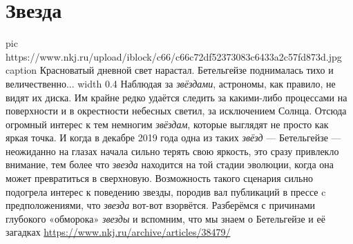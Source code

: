  
 
 
 
 
\chapter{Звезда}

\ifcmt
  pic https://www.nkj.ru/upload/iblock/c66/c66c72df52373083c6433a2c57fd873d.jpg
	caption Красноватый дневной свет нарастал. Бетельгейзе поднималась тихо и величественно... 
	width 0.4
\fi
Наблюдая за \emph{звёздами}, астрономы, как правило, не видят их диска. Им
крайне редко удаётся следить за какими-либо процессами на поверхности и в
окрестности небесных светил, за исключением Солнца. Отсюда огромный интерес к
тем немногим \emph{звёздам}, которые выглядят не просто как яркая точка. И
когда в декабре 2019 года одна из таких \emph{звёзд} — Бетельгейзе — неожиданно
на глазах начала сильно терять свою яркость, это сразу привлекло внимание, тем
более что \emph{звезда} находится на той стадии эволюции, когда она может
превратиться в сверхновую. Возможность такого сценария сильно подогрела интерес
к поведению звезды, породив вал публикаций в прессе c предположениями, что
\emph{звезда} вот-вот взорвётся.  Разберёмся с причинами глубокого «обморока»
\emph{звезды} и вспомним, что мы знаем о Бетельгейзе и её загадках
\url{https://www.nkj.ru/archive/articles/38479/}

